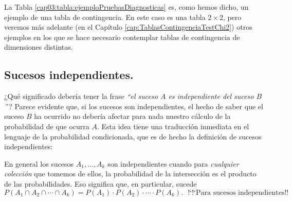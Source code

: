       La Tabla \ref{cap03:tabla:ejemploPruebasDiagnosticas} es, como hemos dicho, un ejemplo de una {\sf tabla de contingencia}. En este caso es una tabla $2\times 2$, pero veremos más adelante (en el Capítulo \ref{cap:TablasContingenciaTestChi2}) otros ejemplos en los que se hace necesario contemplar tablas de contingencia de dimensiones distintas.


\subsection{Sucesos independientes.}
\label{cap03:subsec:SucesosIndependientes}

¿Qué significado debería tener la frase {\em ``el suceso $A$ es independiente del suceso $B$''}\,? Parece evidente que, si los sucesos son independientes, el hecho de saber que el suceso $B$ ha ocurrido no debería afectar para nada nuestro cálculo de la probabilidad de que ocurra $A$. Esta idea tiene una traducción inmediata en el lenguaje de la probabilidad condicionada, que es de hecho la definición de sucesos independientes:
        \begin{center}
        \end{center}
En general los sucesos $A_1,\ldots,A_k$ son independientes cuando para {\em cualquier colección} que tomemos de ellos, la probabilidad de la intersección es el producto de las probabilidades. Eso significa que, en particular, sucede
    \begin{equation}\label{cap03:ecu:ReglaProductoProbabilidad_N_SucesosIndependientes}
        P(A_1\cap A_2\cap\cdots\cap A_k)=P(A_1) \cdot P(A_2)\cdot\cdots\cdot P(A_k).\mbox{ {!`}{!`}Para sucesos independientes!!}
    \end{equation}
